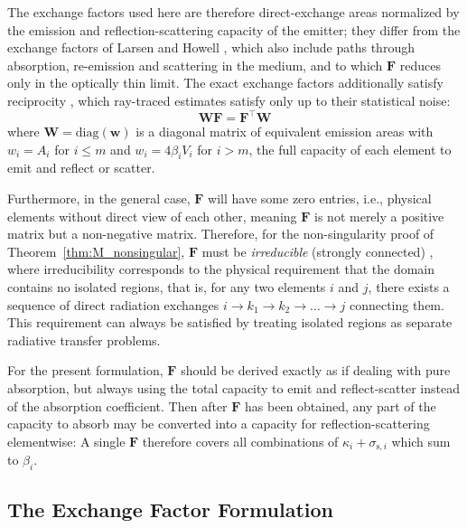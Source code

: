 \documentclass[preprint,1p,times]{elsarticle}
\theoremstyle{plain}
\theoremstyle{definition}
\theoremstyle{remark}
\begin{document}
The exchange factors used here are therefore direct-exchange areas normalized by the emission and reflection-scattering capacity of the emitter; they differ from the exchange factors of Larsen and Howell \citep{LarsenHowell1985}, which also include paths through absorption, re-emission and scattering in the medium, and to which $\mathbf{F}$ reduces only in the optically thin limit. The exact exchange factors additionally satisfy reciprocity \citep{Daun2005}, which ray-traced estimates satisfy only up to their statistical noise:
\begin{equation}
 \mathbf{W} \mathbf{F} = \mathbf{F}^\top  \mathbf{W}
 \label{eq:reciprocity}
\end{equation}
where $\mathbf{W}=\mathrm{diag}(\mathbf{w})$ is a diagonal matrix of equivalent emission areas with $w_i = A_i$ for $i\leq m$ and $w_i=4 \beta_i V_i$ for $i>m$, the full capacity of each element to emit and reflect or scatter.

Furthermore, in the general case, $\mathbf{F}$ will have some zero entries, i.e., physical elements without direct view of each other, meaning $\mathbf{F}$ is not merely a positive matrix but a non-negative matrix. Therefore, for the non-singularity proof of Theorem~\ref{thm:M_nonsingular}, $\mathbf{F}$ must be \textit{irreducible} (strongly connected) \citep{HornJohnson2018}, where irreducibility corresponds to the physical requirement that the domain contains no isolated regions, that is, for any two elements $i$ and $j$, there exists a sequence of direct radiation exchanges $i \to k_1 \to k_2 \to \ldots \to j$ connecting them. This requirement can always be satisfied by treating isolated regions as separate radiative transfer problems.

For the present formulation, $\mathbf{F}$ should be derived exactly as if dealing with pure absorption, but always using the total capacity to emit and reflect-scatter instead of the absorption coefficient. Then after $\mathbf{F}$ has been obtained, any part of the capacity to absorb may be converted into a capacity for reflection-scattering elementwise: A single $\mathbf{F}$ therefore covers all combinations of $\kappa_i+\sigma_{\mathrm{s},i}$ which sum to $\beta_i$.

\subsection{The Exchange Factor Formulation}
\end{document}
